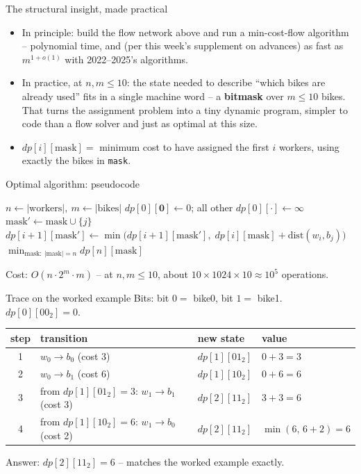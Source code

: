 \documentclass[11pt,aspectratio=169]{beamer}
\begin{document}
\begin{frame}{The structural insight, made practical}
  \begin{itemize}
    \item In principle: build the flow network above and run a min-cost-flow
    algorithm -- polynomial time, and (per this week's supplement on advances) as fast
    as $m^{1+o(1)}$ with 2022--2025's algorithms.
    \item In practice, at $n,m \le 10$: the state needed to describe ``which bikes are
    already used'' fits in a single machine word -- a \textbf{bitmask} over $m\le 10$
    bikes. That turns the assignment problem into a tiny dynamic program, simpler to
    code than a flow solver and just as optimal at this size.
    \item $dp[i][\text{mask}] = $ minimum cost to have assigned the first $i$ workers,
    using exactly the bikes in \texttt{mask}.
  \end{itemize}
\end{frame}

\begin{frame}{Optimal algorithm: pseudocode}
  \footnotesize
  \begin{algorithmic}[1]
      \State $n \gets |\text{workers}|,\ m \gets |\text{bikes}|$
      \State $dp[0][\mathbf{0}] \gets 0$; all other $dp[0][\cdot] \gets \infty$
            \State $\text{mask}' \gets \text{mask} \cup \{j\}$
            \State $dp[i{+}1][\text{mask}'] \gets \min\big(dp[i{+}1][\text{mask}'],\;
            dp[i][\text{mask}] + \text{dist}(w_i, b_j)\big)$
          \EndFor
        \EndFor
      \EndFor
      \State \Return $\min_{\text{mask}:\ |\text{mask}|=n} dp[n][\text{mask}]$
    \EndFunction
  \end{algorithmic}
  Cost: $O(n \cdot 2^m \cdot m)$ -- at $n,m\le 10$, about $10\times1024\times10 \approx
  10^5$ operations.
\end{frame}

\begin{frame}{Trace on the worked example}
  \small
  Bits: bit $0=$ bike0, bit $1=$ bike1. $dp[0][00_2]=0$.
  \begin{center}
  \begin{tabular}{@{}clll@{}}
    \toprule
    step & transition & new state & value \\
    \midrule
    1 & $w_0\to b_0$ (cost 3) & $dp[1][01_2]$ & $0+3=3$ \\
    2 & $w_0\to b_1$ (cost 6) & $dp[1][10_2]$ & $0+6=6$ \\
    3 & from $dp[1][01_2]{=}3$: $w_1\to b_1$ (cost 3) & $dp[2][11_2]$ & $3+3=6$ \\
    4 & from $dp[1][10_2]{=}6$: $w_1\to b_0$ (cost 2) & $dp[2][11_2]$ & $\min(6,\,6{+}2)=6$ \\
    \bottomrule
  \end{tabular}
  \end{center}
  Answer: $dp[2][11_2] = 6$ -- matches the worked example exactly.
\end{frame}
\end{document}
